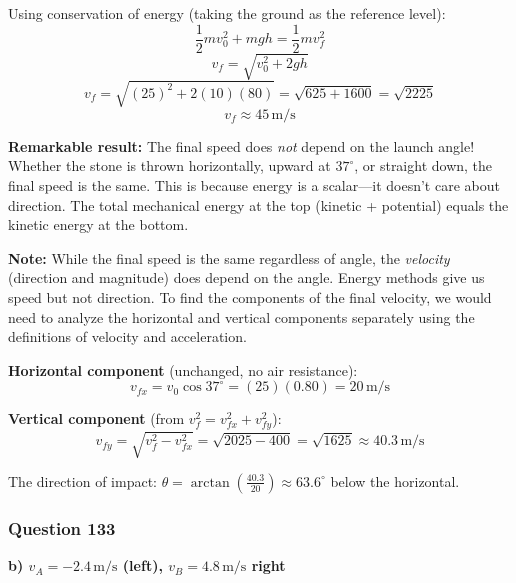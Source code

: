 \documentclass[12pt,letterpaper]{article}
\begin{document}
\begin{explanationbox}
Using conservation of energy (taking the ground as the reference level):
\[
\frac{1}{2}mv_0^2 + mgh = \frac{1}{2}mv_f^2
\]
\[
v_f = \sqrt{v_0^2 + 2gh}
\]
\[
v_f = \sqrt{(25)^2 + 2(10)(80)} = \sqrt{625 + 1600} = \sqrt{2225}
\]
\[
v_f \approx 45\,\text{m/s}
\]

\textbf{Remarkable result:} The final speed does \emph{not} depend on the launch angle! Whether the stone is thrown horizontally, upward at $37^\circ$, or straight down, the final speed is the same. This is because energy is a scalar---it doesn't care about direction. The total mechanical energy at the top (kinetic + potential) equals the kinetic energy at the bottom.

\textbf{Note:} While
the final speed is the same regardless of angle, the \emph{velocity} (direction and magnitude) does depend on the angle. Energy methods give us speed but not direction. To find the components of the final velocity, we would need to analyze the horizontal and vertical components separately using the definitions of velocity and acceleration.

\textbf{Horizontal component} (unchanged, no air resistance):
\[
v_{fx} = v_0 \cos 37^\circ = (25)(0.80) = 20\,\text{m/s}
\]

\textbf{Vertical component} (from $v_f^2 = v_{fx}^2 + v_{fy}^2$):
\[
v_{fy} = \sqrt{v_f^2 - v_{fx}^2} = \sqrt{2025 - 400} = \sqrt{1625} \approx 40.3\,\text{m/s}
\]

The direction of impact: $\theta = \arctan\left(\frac{40.3}{20}\right) \approx 63.6^\circ$ below the horizontal.
\end{explanationbox}

\subsubsection*{Question 133}

\begin{answerbox}
\textbf{b) $v_A = -2.4\,\text{m/s}$ (left), $v_B = 4.8\,\text{m/s}$ right}
\end{answerbox}
\end{document}
